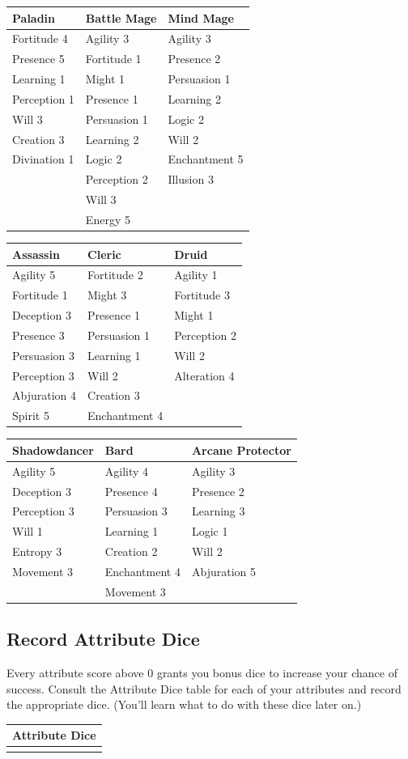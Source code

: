 \documentclass[12pt]{report}
\begin{document}
\begin{longtable}[c]{@{}lll@{}}
\toprule
Paladin & Battle Mage & Mind Mage\tabularnewline
\midrule
\endhead
Fortitude 4 & Agility 3 & Agility 3\tabularnewline
Presence 5 & Fortitude 1 & Presence 2\tabularnewline
Learning 1 & Might 1 & Persuasion 1\tabularnewline
Perception 1 & Presence 1 & Learning 2\tabularnewline
Will 3 & Persuasion 1 & Logic 2\tabularnewline
Creation 3 & Learning 2 & Will 2\tabularnewline
Divination 1 & Logic 2 & Enchantment 5\tabularnewline
& Perception 2 & Illusion 3\tabularnewline
& Will 3 &\tabularnewline
& Energy 5 &\tabularnewline
\bottomrule
\end{longtable}

\begin{longtable}[c]{@{}lll@{}}
\toprule
Assassin & Cleric & Druid\tabularnewline
\midrule
\endhead
Agility 5 & Fortitude 2 & Agility 1\tabularnewline
Fortitude 1 & Might 3 & Fortitude 3\tabularnewline
Deception 3 & Presence 1 & Might 1\tabularnewline
Presence 3 & Persuasion 1 & Perception 2\tabularnewline
Persuasion 3 & Learning 1 & Will 2\tabularnewline
Perception 3 & Will 2 & Alteration 4\tabularnewline
Abjuration 4 & Creation 3 &\tabularnewline
Spirit 5 & Enchantment 4 &\tabularnewline
\bottomrule
\end{longtable}

\begin{longtable}[c]{@{}lll@{}}
\toprule
Shadowdancer & Bard & Arcane Protector\tabularnewline
\midrule
\endhead
Agility 5 & Agility 4 & Agility 3\tabularnewline
Deception 3 & Presence 4 & Presence 2\tabularnewline
Perception 3 & Persuasion 3 & Learning 3\tabularnewline
Will 1 & Learning 1 & Logic 1\tabularnewline
Entropy 3 & Creation 2 & Will 2\tabularnewline
Movement 3 & Enchantment 4 & Abjuration 5\tabularnewline
& Movement 3 &\tabularnewline
\bottomrule
\end{longtable}

\subsection{Record Attribute Dice}\label{record-attribute-dice}

Every attribute score above 0 grants you bonus dice to increase your
chance of success. Consult the Attribute Dice table for each of your
attributes and record the appropriate dice. (You'll learn what to do
with these dice later on.)

\begin{longtable}[c]{@{}l@{}}
\toprule
Attribute Dice\tabularnewline
\midrule
\endhead
\tabularnewline
\bottomrule
\end{longtable}
\end{document}
